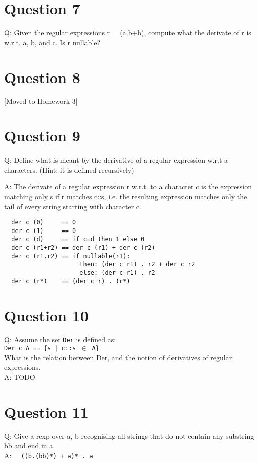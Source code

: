 \documentclass[english]{scrartcl}
\begin{document}
\section*{Question 7}
Q: Given the regular expressions r = (a.b+b), compute what the derivate of r is w.r.t. a, b, and c. Is r nullable?

\section*{Question 8}
[Moved to Homework 3]

\section*{Question 9}
Q: Define what is meant by the derivative of a regular expression w.r.t a characters. (Hint: it is defined recursively)

A: The derivate of a regular expression r w.r.t. to a character c is the expression matching only s if r matches c::s, i.e. the resulting expression
matches only the tail of every string starting with character c.

\begin{verbatim}
  der c (0)     == 0
  der c (1)     == 0
  der c (d)     == if c=d then 1 else 0
  der c (r1+r2) == der c (r1) + der c (r2)
  der c (r1.r2) == if nullable(r1):
                     then: (der c r1) . r2 + der c r2
                     else: (der c r1) . r2
  der c (r*)    == (der c r) . (r*)
\end{verbatim}

\section*{Question 10}
Q: Assume the set \verb|Der| is defined as: \\
\verb~Der c A == {s | c::s ~$\in$\verb~ A}~ \\
What is the relation between Der, and the notion of derivatives of regular expressions. \\
A: TODO

\section*{Question 11}
Q: Give a rexp over {a, b} recognising all strings that do not contain any substring bb and end in a. \\
A: \verb~  ((b.(bb)*) + a)* . a ~
\end{document}
